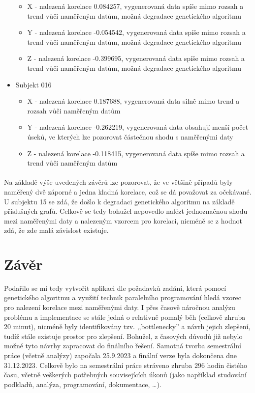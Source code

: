 \documentclass[12pt, a4paper]{article}
\begin{document}
\begin{itemize}
      \begin{itemize}
        \item X - nalezená korelace 0.084257, vygenerovaná data spíše mimo rozsah a trend vůči naměřeným datům, možná degradace genetického algoritmu
        \item Y - nalezená korelace -0.054542, vygenerovaná data spíše mimo rozsah a trend vůči naměřeným datům, možná degradace genetického algoritmu
        \item Z - nalezená korelace -0.399695, vygenerovaná data spíše mimo rozsah a trend vůči naměřeným datům, možná degradace genetického algoritmu
      \end{itemize}
  \item Subjekt 016
      \begin{itemize}
        \item X - nalezená korelace 0.187688, vygenerovaná data silně mimo trend a rozsah vůči naměřeným datům  
        \item Y - nalezená korelace -0.262219, vygenerovaná data obsahují menší počet úseků, ve kterých lze pozorovat částečnou shodu s naměřenými daty 
        \item Z - nalezená korelace -0.118415, vygenerovaná data spíše mimo rozsah a trend vůči naměřeným datům
      \end{itemize}
\end{itemize}

\paragraph{} Na základě výše uvedených závěrů lze pozorovat, že ve většině případů byly naměřený dvě záporné a jedna kladná korelace, což se dá považovat za očekávané.
U subjektu 15 se zdá, že došlo k degradaci genetického algoritmu na základě příslušných grafů. 
Celkově se tedy bohužel nepovedlo nalézt jednoznačnou shodu mezi naměřenými daty a nalezeným vzorcem pro korelaci, nicméně se z hodnot zdá, že zde malá závislost existuje.

\newpage
\section{Závěr}
\paragraph{} Podařilo se mi tedy vytvořit aplikaci dle požadavků zadání, která pomocí genetického algoritmu a využití technik paralelního programování hledá vzorec pro nalezení korelace mezi naměřenými daty.
I přes časově náročnou analýzu problému a implementace se stále jedná o relativně pomalý běh (celkově zhruba 20 minut), nicméně byly identifikovány tzv. ,,bottlenecky'' a návrh jejich zlepšení, tudíž stále existuje prostor pro zlepšení.
Bohužel, z časových důvodů již nebylo možné tyto návrhy zapracovat do finálního řešení. 
Samotná tvorba semestrální práce (včetně analýzy) započala 25.9.2023 a finální verze byla dokončena dne 31.12.2023.
Celkově bylo na semestrální práce stráveno zhruba 296 hodin čistého času, včetně veškerých potřebných souvisejících úkonů (jako například studování podkladů, analýza, programování, dokumentace, \dots).
\end{document}
